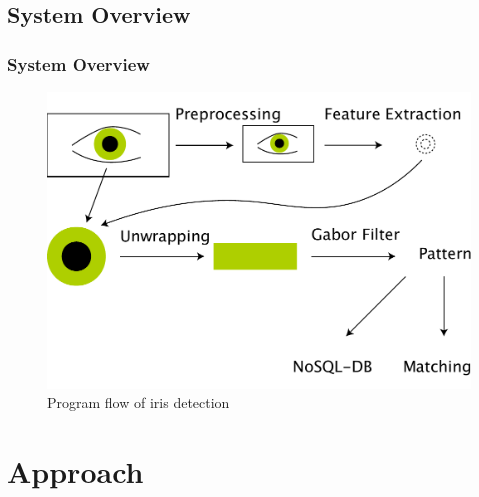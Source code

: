 \documentclass{beamer}
\begin{document}
\subsection{System Overview} 
\begin{frame}
	\frametitle{System Overview} 
	\begin{figure}
		[ht] \centering 
		\includegraphics[width=0.85
		\textwidth]{../report/iris/flow} \caption{Program flow of iris detection} \label{fig:flow} 
	\end{figure}
\end{frame}
\section{Approach} 
\end{document}
